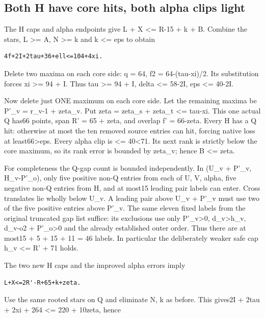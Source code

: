 \documentclass[11pt,a4paper]{article}
\begin{document}
\hypertarget{both-h-have-core-hits-both-alpha-clips-light}{%
\subsection{Both H have core hits, both alpha clips
light}\label{both-h-have-core-hits-both-alpha-clips-light}}

The H caps and alpha endpoints give L + X \textless= R-15 + k + B.
Combine the stars, L \textgreater= A, N \textgreater= k and k \textless=
eps to obtain

\begin{verbatim}
4f+2I+2tau+36+ell<=104+4xi.
\end{verbatim}

Delete two maxima on each core side: q = 64, f2 = 64-(tau-xi)/2. Its
substitution forces xi \textgreater= 94 + I. Thus tau \textgreater= 94 +
I, delta \textless= 58-2I, eps \textless= 40-2I.

Now delete just ONE maximum on each core side. Let the remaining maxima
be P'\_v = r\_v-1 + zeta\_v. Put zeta = zeta\_s + zeta\_t \textless=
tau-xi. This one actual Q has66 points, span R' = 65 + zeta, and overlap
f' = 66-zeta. Every H has a Q hit: otherwise at most the ten removed
source entries can hit, forcing native loss at least66\textgreater eps.
Every alpha clip is \textless= 40\textless71. Its next rank is strictly
below the core maximum, so its rank error is bounded by zeta\_v; hence B
\textless= zeta.

For completeness the Q-gap count is bounded independently. In (U\_v +
P'\_v, H\_v-P'\_o), only five positive non-Q entries from each of U, V,
alpha, five negative non-Q entries from H, and at most15 leading pair
labels can enter. Cross translates lie wholly below U\_v. A leading pair
above U\_v + P'\_v must use two of the five positive entries above
P'\_v. The same eleven fixed labels from the original truncated gap list
suffice: its exclusions use only P'\_v\textgreater0,
d\_v\textgreater h\_v, d\_v-o2 + P'\_o\textgreater0 and the already
established outer order. Thus there are at most15 + 5 + 15 + 11 = 46
labels. In particular the deliberately weaker safe cap h\_v \textless=
R' + 71 holds.

The two new H caps and the improved alpha errors imply

\begin{verbatim}
L+X<=2R'-R+65+k+zeta.
\end{verbatim}

Use the same rooted stars on Q and eliminate N, k as before. This
gives2I + 2tau + 2xi + 264 \textless= 220 + 10zeta, hence
\end{document}
